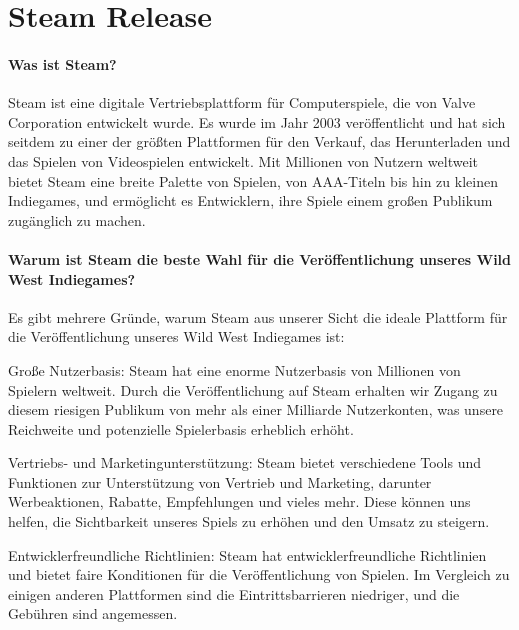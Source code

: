 
\chapter{Steam Release}\label{ch:steamrelease}
\renewcommand{\kapitelautor}{Autor: Nils} %

%
\subsubsection{Was ist Steam?}\label{subsubsec:Steam-Vorstellung}

Steam ist eine digitale Vertriebsplattform für Computerspiele, die von Valve Corporation entwickelt wurde. Es wurde im Jahr 2003 veröffentlicht und hat sich seitdem zu einer der größten Plattformen für den Verkauf, das Herunterladen und das Spielen von Videospielen entwickelt. Mit Millionen von Nutzern weltweit bietet Steam eine breite Palette von Spielen, von AAA-Titeln bis hin zu kleinen Indiegames, und ermöglicht es Entwicklern, ihre Spiele einem großen Publikum zugänglich zu machen.\cite[vgl.]{Steam}

\subsubsection{Warum ist Steam die beste Wahl für die Veröffentlichung unseres Wild West Indiegames?}\label{subsubsec:Warum-Steam}

Es gibt mehrere Gründe, warum Steam aus unserer Sicht die ideale Plattform für die Veröffentlichung unseres Wild West Indiegames ist:

\begin{liste}
   \item Große Nutzerbasis: Steam hat eine enorme Nutzerbasis von Millionen von Spielern weltweit. Durch die Veröffentlichung auf Steam erhalten wir Zugang zu diesem riesigen Publikum von mehr als einer Milliarde Nutzerkonten, was unsere Reichweite und potenzielle Spielerbasis erheblich erhöht.\cite[vgl.]{Steamzahlen}
   \item Vertriebs- und Marketingunterstützung: Steam bietet verschiedene Tools und Funktionen zur Unterstützung von Vertrieb und Marketing, darunter Werbeaktionen, Rabatte, Empfehlungen und vieles mehr. Diese können uns helfen, die Sichtbarkeit unseres Spiels zu erhöhen und den Umsatz zu steigern.
   \item Entwicklerfreundliche Richtlinien: Steam hat entwicklerfreundliche Richtlinien und bietet faire Konditionen für die Veröffentlichung von Spielen. Im Vergleich zu einigen anderen Plattformen sind die Eintrittsbarrieren niedriger, und die Gebühren sind angemessen.
\end{liste}

